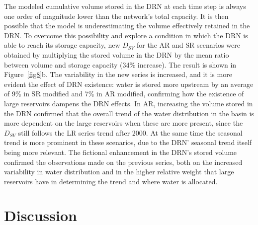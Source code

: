 \documentclass[draft]{agujournal2019}
\begin{document}
The modeled cumulative volume stored in the DRN at each time step is always one order of magnitude lower than the network’s total capacity. It is then possible that the model is underestimating the volume effectively retained in the DRN. To overcome this possibility and explore a condition in which the DRN is able to reach its storage capacity, new $D_{SV}$ for the AR and SR scenarios were obtained by multiplying the stored volume in the DRN by the mean ratio between volume and storage capacity (34\% increase). The result is shown in Figure~\ref{fig8}b. The variability in the new series is increased, and it is more evident the effect of DRN existence: water is stored more upstream by an average of 9\% in SR modified and 7\% in AR modified, confirming how the existence of large reservoirs dampens the DRN effects. In AR, increasing the volume stored in the DRN confirmed that the overall trend of the water distribution in the basin is more dependent on the large reservoirs when these are more present, since the $D_{SV}$ still follows the LR series trend after 2000. At the same time the seasonal trend is more prominent in these scenarios, due to the DRN’ seasonal trend itself being more relevant. The fictional enhancement in the DRN’s stored volume confirmed the observations made on the previous series, both on the increased variability in water distribution and in the higher relative weight that large reservoirs have in determining the trend and where water is allocated.

\section{Discussion}
\end{document}
